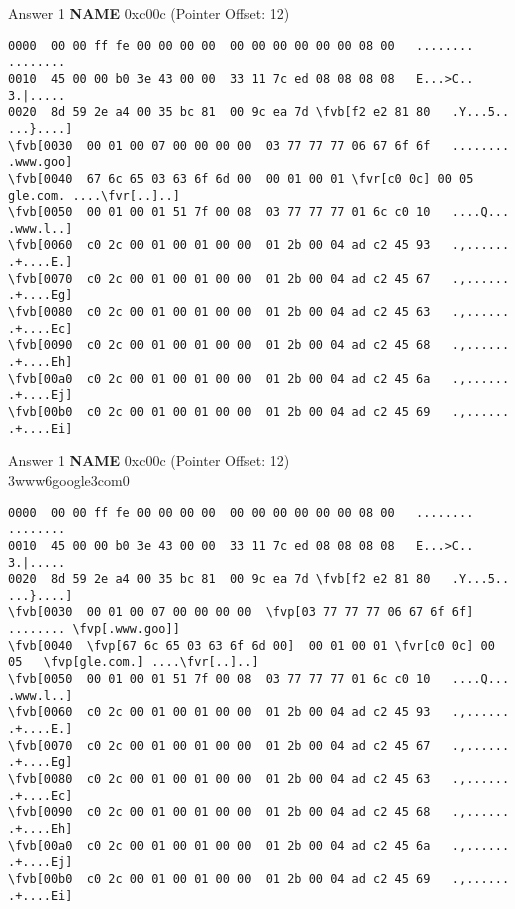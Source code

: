 \documentclass{beamer}
\newcommand*{\fvr}[1]{\textcolor{red}{#1}}
\newcommand*{\fvb}[1]{\textcolor{blue}{#1}}
\newcommand*{\fvp}[1]{\textcolor{purple}{#1}}
\begin{document}
  \begin{frame}[fragile]{\mytitle}{Answer 1}
    \textbf{NAME} 0xc00c (Pointer Offset: 12)
    \vfill
    \tiny
    \begin{Verbatim}[commandchars=\\\[\]]
0000  00 00 ff fe 00 00 00 00  00 00 00 00 00 00 08 00   ........ ........
0010  45 00 00 b0 3e 43 00 00  33 11 7c ed 08 08 08 08   E...>C.. 3.|.....
0020  8d 59 2e a4 00 35 bc 81  00 9c ea 7d \fvb[f2 e2 81 80   .Y...5.. ...}....]
\fvb[0030  00 01 00 07 00 00 00 00  03 77 77 77 06 67 6f 6f   ........ .www.goo]
\fvb[0040  67 6c 65 03 63 6f 6d 00  00 01 00 01 \fvr[c0 0c] 00 05   gle.com. ....\fvr[..]..]
\fvb[0050  00 01 00 01 51 7f 00 08  03 77 77 77 01 6c c0 10   ....Q... .www.l..]
\fvb[0060  c0 2c 00 01 00 01 00 00  01 2b 00 04 ad c2 45 93   .,...... .+....E.]
\fvb[0070  c0 2c 00 01 00 01 00 00  01 2b 00 04 ad c2 45 67   .,...... .+....Eg]
\fvb[0080  c0 2c 00 01 00 01 00 00  01 2b 00 04 ad c2 45 63   .,...... .+....Ec]
\fvb[0090  c0 2c 00 01 00 01 00 00  01 2b 00 04 ad c2 45 68   .,...... .+....Eh]
\fvb[00a0  c0 2c 00 01 00 01 00 00  01 2b 00 04 ad c2 45 6a   .,...... .+....Ej]
\fvb[00b0  c0 2c 00 01 00 01 00 00  01 2b 00 04 ad c2 45 69   .,...... .+....Ei]
    \end{Verbatim}
\end{frame}

  \begin{frame}[fragile]{\mytitle}{Answer 1}
    \textbf{NAME} 0xc00c (Pointer Offset: 12)\\
    3www6google3com0
    \vfill
    \tiny
    \begin{Verbatim}[commandchars=\\\[\]]
0000  00 00 ff fe 00 00 00 00  00 00 00 00 00 00 08 00   ........ ........
0010  45 00 00 b0 3e 43 00 00  33 11 7c ed 08 08 08 08   E...>C.. 3.|.....
0020  8d 59 2e a4 00 35 bc 81  00 9c ea 7d \fvb[f2 e2 81 80   .Y...5.. ...}....]
\fvb[0030  00 01 00 07 00 00 00 00  \fvp[03 77 77 77 06 67 6f 6f]   ........ \fvp[.www.goo]]
\fvb[0040  \fvp[67 6c 65 03 63 6f 6d 00]  00 01 00 01 \fvr[c0 0c] 00 05   \fvp[gle.com.] ....\fvr[..]..]
\fvb[0050  00 01 00 01 51 7f 00 08  03 77 77 77 01 6c c0 10   ....Q... .www.l..]
\fvb[0060  c0 2c 00 01 00 01 00 00  01 2b 00 04 ad c2 45 93   .,...... .+....E.]
\fvb[0070  c0 2c 00 01 00 01 00 00  01 2b 00 04 ad c2 45 67   .,...... .+....Eg]
\fvb[0080  c0 2c 00 01 00 01 00 00  01 2b 00 04 ad c2 45 63   .,...... .+....Ec]
\fvb[0090  c0 2c 00 01 00 01 00 00  01 2b 00 04 ad c2 45 68   .,...... .+....Eh]
\fvb[00a0  c0 2c 00 01 00 01 00 00  01 2b 00 04 ad c2 45 6a   .,...... .+....Ej]
\fvb[00b0  c0 2c 00 01 00 01 00 00  01 2b 00 04 ad c2 45 69   .,...... .+....Ei]
    \end{Verbatim}
\end{frame}
\end{document}
